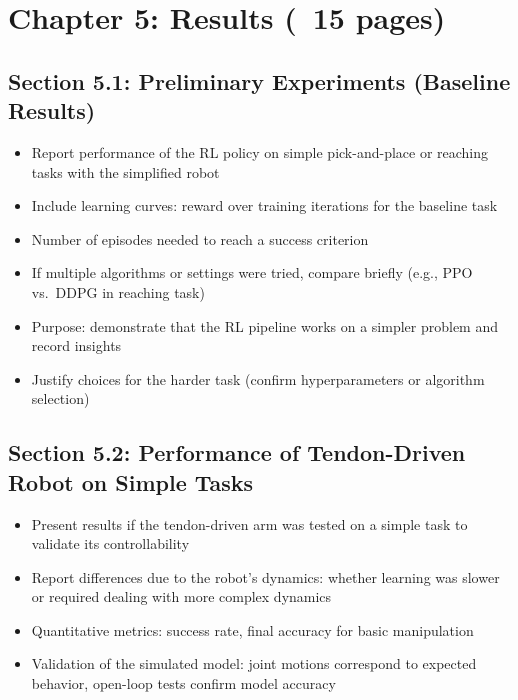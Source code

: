 \section{Chapter 5: Results (~15 pages)}

\subsection{Section 5.1: Preliminary Experiments (Baseline Results)}
\begin{itemize}
    \item Report performance of the RL policy on simple pick-and-place or reaching tasks with the simplified robot
    \item Include learning curves: reward over training iterations for the baseline task
    \item Number of episodes needed to reach a success criterion
    \item If multiple algorithms or settings were tried, compare briefly (e.g., PPO vs.\ DDPG in reaching task)
    \item Purpose: demonstrate that the RL pipeline works on a simpler problem and record insights
    \item Justify choices for the harder task (confirm hyperparameters or algorithm selection)
\end{itemize}

\subsection{Section 5.2: Performance of Tendon-Driven Robot on Simple Tasks}
\begin{itemize}
    \item Present results if the tendon-driven arm was tested on a simple task to validate its controllability
    \item Report differences due to the robot's dynamics: whether learning was slower or required dealing with more complex dynamics
    \item Quantitative metrics: success rate, final accuracy for basic manipulation
    \item Validation of the simulated model: joint motions correspond to expected behavior, open-loop tests confirm model accuracy
\end{itemize}

